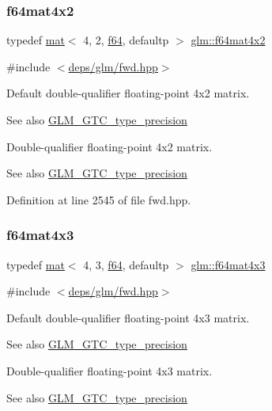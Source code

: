 \subsubsection{\texorpdfstring{f64mat4x2}{f64mat4x2}}
{\footnotesize\ttfamily typedef \hyperlink{structglm_1_1mat}{mat}$<$ 4, 2, \hyperlink{group__gtc__type__precision_ga2bba392e555124b36cde6abba349bab3}{f64}, defaultp $>$ \hyperlink{group__gtc__type__precision_ga704001c2ed5838498ff61f55995fed3a}{glm\+::f64mat4x2}}



{\ttfamily \#include $<$\hyperlink{fwd_8hpp}{deps/glm/fwd.\+hpp}$>$}

Default double-\/qualifier floating-\/point 4x2 matrix. \begin{DoxySeeAlso}{See also}
\hyperlink{group__gtc__type__precision}{G\+L\+M\+\_\+\+G\+T\+C\+\_\+type\+\_\+precision}
\end{DoxySeeAlso}
Double-\/qualifier floating-\/point 4x2 matrix. \begin{DoxySeeAlso}{See also}
\hyperlink{group__gtc__type__precision}{G\+L\+M\+\_\+\+G\+T\+C\+\_\+type\+\_\+precision} 
\end{DoxySeeAlso}


Definition at line 2545 of file fwd.\+hpp.

\mbox{\label{group__gtc__type__precision_gaf9b2bfbb2c79a39c693e2ab2bedf30e5}} 
\subsubsection{\texorpdfstring{f64mat4x3}{f64mat4x3}}
{\footnotesize\ttfamily typedef \hyperlink{structglm_1_1mat}{mat}$<$ 4, 3, \hyperlink{group__gtc__type__precision_ga2bba392e555124b36cde6abba349bab3}{f64}, defaultp $>$ \hyperlink{group__gtc__type__precision_gaf9b2bfbb2c79a39c693e2ab2bedf30e5}{glm\+::f64mat4x3}}



{\ttfamily \#include $<$\hyperlink{fwd_8hpp}{deps/glm/fwd.\+hpp}$>$}

Default double-\/qualifier floating-\/point 4x3 matrix. \begin{DoxySeeAlso}{See also}
\hyperlink{group__gtc__type__precision}{G\+L\+M\+\_\+\+G\+T\+C\+\_\+type\+\_\+precision}
\end{DoxySeeAlso}
Double-\/qualifier floating-\/point 4x3 matrix. \begin{DoxySeeAlso}{See also}
\hyperlink{group__gtc__type__precision}{G\+L\+M\+\_\+\+G\+T\+C\+\_\+type\+\_\+precision} 
\end{DoxySeeAlso}


